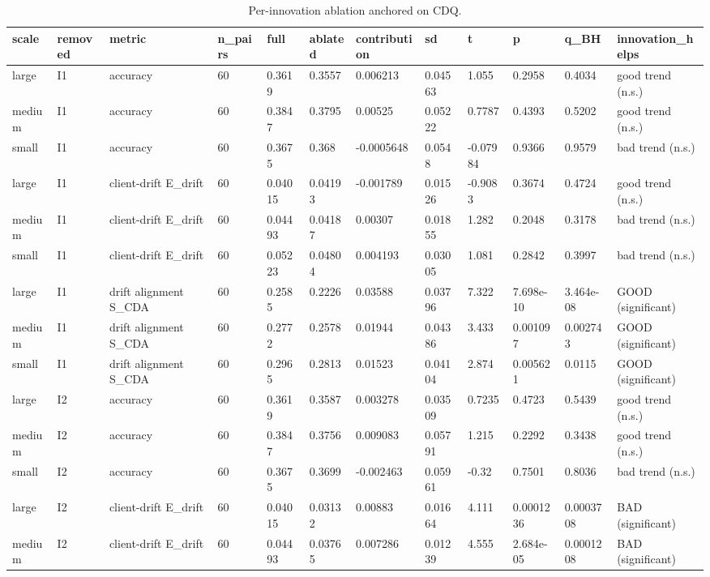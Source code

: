 \begin{table}[t]\centering\footnotesize
\caption{Per-innovation ablation anchored on CDQ.}\label{tab:table11_innovation_ablation_cdq}
\begin{tabular}{llllllllllll}
\toprule
scale & removed & metric & n\_pairs & full & ablated & contribution & sd & t & p & q\_BH & innovation\_helps \\
\midrule
large & I1 & accuracy & 60 & 0.3619 & 0.3557 & 0.006213 & 0.04563 & 1.055 & 0.2958 & 0.4034 & good trend (n.s.) \\
medium & I1 & accuracy & 60 & 0.3847 & 0.3795 & 0.00525 & 0.05222 & 0.7787 & 0.4393 & 0.5202 & good trend (n.s.) \\
small & I1 & accuracy & 60 & 0.3675 & 0.368 & -0.0005648 & 0.0548 & -0.07984 & 0.9366 & 0.9579 & bad trend (n.s.) \\
large & I1 & client-drift E\_drift & 60 & 0.04015 & 0.04193 & -0.001789 & 0.01526 & -0.9083 & 0.3674 & 0.4724 & good trend (n.s.) \\
medium & I1 & client-drift E\_drift & 60 & 0.04493 & 0.04187 & 0.00307 & 0.01855 & 1.282 & 0.2048 & 0.3178 & bad trend (n.s.) \\
small & I1 & client-drift E\_drift & 60 & 0.05223 & 0.04804 & 0.004193 & 0.03005 & 1.081 & 0.2842 & 0.3997 & bad trend (n.s.) \\
large & I1 & drift alignment S\_CDA & 60 & 0.2585 & 0.2226 & 0.03588 & 0.03796 & 7.322 & 7.698e-10 & 3.464e-08 & GOOD (significant) \\
medium & I1 & drift alignment S\_CDA & 60 & 0.2772 & 0.2578 & 0.01944 & 0.04386 & 3.433 & 0.001097 & 0.002743 & GOOD (significant) \\
small & I1 & drift alignment S\_CDA & 60 & 0.2965 & 0.2813 & 0.01523 & 0.04104 & 2.874 & 0.005621 & 0.0115 & GOOD (significant) \\
large & I2 & accuracy & 60 & 0.3619 & 0.3587 & 0.003278 & 0.03509 & 0.7235 & 0.4723 & 0.5439 & good trend (n.s.) \\
medium & I2 & accuracy & 60 & 0.3847 & 0.3756 & 0.009083 & 0.05791 & 1.215 & 0.2292 & 0.3438 & good trend (n.s.) \\
small & I2 & accuracy & 60 & 0.3675 & 0.3699 & -0.002463 & 0.05961 & -0.32 & 0.7501 & 0.8036 & bad trend (n.s.) \\
large & I2 & client-drift E\_drift & 60 & 0.04015 & 0.03132 & 0.00883 & 0.01664 & 4.111 & 0.0001236 & 0.0003708 & BAD (significant) \\
medium & I2 & client-drift E\_drift & 60 & 0.04493 & 0.03765 & 0.007286 & 0.01239 & 4.555 & 2.684e-05 & 0.0001208 & BAD (significant) \\

\end{tabular}
\end{table}
